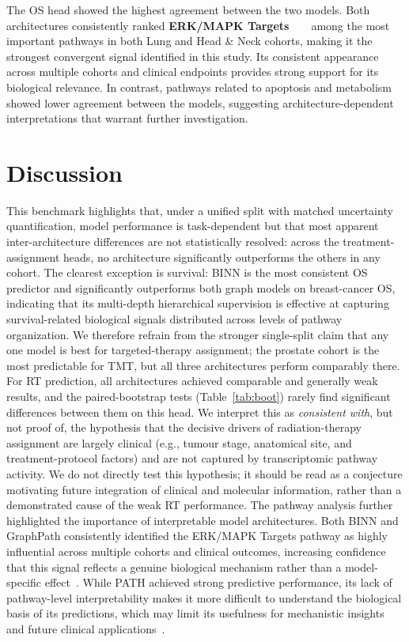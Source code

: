 \documentclass[sigconf]{acmart}
\begin{document}
The OS head showed the highest agreement between the two models. Both architectures consistently ranked \textbf{ERK/MAPK Targets} ~\cite{zhao2015erk} ~\cite{fisch2022mapkhnscc} among the most important pathways in both Lung and Head \& Neck cohorts, making it the strongest convergent signal identified in this study. Its consistent appearance across multiple cohorts and clinical endpoints provides strong support for its biological relevance. In contrast, pathways related to apoptosis and metabolism showed lower agreement between the models, suggesting architecture-dependent interpretations that warrant further investigation.

\section{Discussion}
This benchmark highlights that, under a unified split with matched
uncertainty quantification, model performance is task-dependent but that
most apparent inter-architecture differences are not statistically resolved:
across the treatment-assignment heads, no architecture significantly
outperforms the others in any cohort. The clearest exception is survival:
BINN is the most consistent OS predictor and significantly outperforms both
graph models on breast-cancer OS, indicating that its multi-depth
hierarchical supervision is effective at capturing survival-related
biological signals distributed across levels of pathway organization. We
therefore refrain from the stronger single-split claim that any one model is
best for targeted-therapy assignment; the prostate cohort is the most
predictable for TMT, but all three architectures perform comparably there. For RT prediction, all architectures achieved comparable and generally weak results, and the paired-bootstrap tests (Table~\ref{tab:boot}) rarely find significant differences between them on this head. We interpret this as \emph{consistent with}, but not proof of, the hypothesis that the decisive drivers of radiation-therapy assignment are largely clinical (e.g., tumour stage, anatomical site, and treatment-protocol factors) and are not captured by transcriptomic pathway activity. We do not directly test this hypothesis; it should be read as a conjecture motivating future integration of clinical and molecular information, rather than a demonstrated cause of the weak RT performance. The pathway analysis further highlighted the importance of interpretable model architectures. Both BINN and GraphPath consistently identified the ERK/MAPK Targets pathway as highly influential across multiple cohorts and clinical outcomes, increasing confidence that this signal reflects a genuine biological mechanism rather than a model-specific effect~\cite{dhillon2007map}. While PATH achieved strong predictive performance, its lack of pathway-level interpretability makes it more difficult to understand the biological basis of its predictions, which may limit its usefulness for mechanistic insights and future clinical applications~\cite{clauwaert2021explainabletransformer,rosenbacke2024how}.
\end{document}

